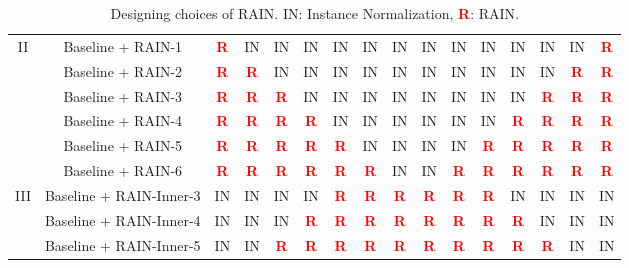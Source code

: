 \documentclass[final]{cvpr}
\begin{document}
\begin{table*}[!tp]
\begin{center}
\begin{tabular}{|c|c|c|c|c|c|c|c|c|c|c|c|c|c|c|c|}
\hline\hline
\multirow{6}{*}{II}& Baseline + RAIN-1 & \textcolor{red}{\textbf{R}} & IN & IN & IN & IN & IN & IN & IN & IN & IN & IN & IN & IN & \textcolor{red}{\textbf{R}} \\
& Baseline + RAIN-2 & \textcolor{red}{\textbf{R}} & \textcolor{red}{\textbf{R}} & IN & IN & IN & IN & IN & IN & IN & IN & IN & IN & \textcolor{red}{\textbf{R}} & \textcolor{red}{\textbf{R}} \\
& Baseline + RAIN-3 & \textcolor{red}{\textbf{R}} & \textcolor{red}{\textbf{R}} & \textcolor{red}{\textbf{R}} & IN & IN & IN & IN & IN & IN & IN & IN & \textcolor{red}{\textbf{R}} & \textcolor{red}{\textbf{R}} & \textcolor{red}{\textbf{R}} \\
& Baseline + RAIN-4 & \textcolor{red}{\textbf{R}} & \textcolor{red}{\textbf{R}} & \textcolor{red}{\textbf{R}} & \textcolor{red}{\textbf{R}} & IN & IN & IN & IN & IN & IN & \textcolor{red}{\textbf{R}} & \textcolor{red}{\textbf{R}} & \textcolor{red}{\textbf{R}} & \textcolor{red}{\textbf{R}} \\
& Baseline + RAIN-5 & \textcolor{red}{\textbf{R}} & \textcolor{red}{\textbf{R}} & \textcolor{red}{\textbf{R}} & \textcolor{red}{\textbf{R}} & \textcolor{red}{\textbf{R}} & IN & IN & IN & IN & \textcolor{red}{\textbf{R}} & \textcolor{red}{\textbf{R}} & \textcolor{red}{\textbf{R}} & \textcolor{red}{\textbf{R}} & \textcolor{red}{\textbf{R}} \\
& Baseline + RAIN-6 & \textcolor{red}{\textbf{R}} & \textcolor{red}{\textbf{R}} & \textcolor{red}{\textbf{R}} & \textcolor{red}{\textbf{R}} & \textcolor{red}{\textbf{R}} & \textcolor{red}{\textbf{R}} & IN & IN & \textcolor{red}{\textbf{R}} & \textcolor{red}{\textbf{R}} & \textcolor{red}{\textbf{R}} & \textcolor{red}{\textbf{R}} & \textcolor{red}{\textbf{R}} & \textcolor{red}{\textbf{R}} \\
\hline\hline
\multirow{3}{*}{III}& Baseline + RAIN-Inner-3 & IN & IN & IN & IN & \textcolor{red}{\textbf{R}} & \textcolor{red}{\textbf{R}} & \textcolor{red}{\textbf{R}} & \textcolor{red}{\textbf{R}} & \textcolor{red}{\textbf{R}} & \textcolor{red}{\textbf{R}} & IN & IN & IN & IN\\
& Baseline + RAIN-Inner-4 & IN & IN & IN & \textcolor{red}{\textbf{R}} & \textcolor{red}{\textbf{R}} & \textcolor{red}{\textbf{R}} & \textcolor{red}{\textbf{R}} & \textcolor{red}{\textbf{R}} & \textcolor{red}{\textbf{R}} & \textcolor{red}{\textbf{R}} & \textcolor{red}{\textbf{R}} & IN & IN & IN\\
& Baseline + RAIN-Inner-5 & IN & IN & \textcolor{red}{\textbf{R}} & \textcolor{red}{\textbf{R}} & \textcolor{red}{\textbf{R}} & \textcolor{red}{\textbf{R}} & \textcolor{red}{\textbf{R}} & \textcolor{red}{\textbf{R}} & \textcolor{red}{\textbf{R}} & \textcolor{red}{\textbf{R}} & \textcolor{red}{\textbf{R}} & \textcolor{red}{\textbf{R}} & IN & IN\\
\hline
\end{tabular}
\end{center}
\caption{Designing choices of RAIN. IN: Instance Normalization, \textcolor{red}{\textbf{R}}: RAIN. }
\label{tab:applying_choice_of_RAIN}
\end{table*}
\end{document}
